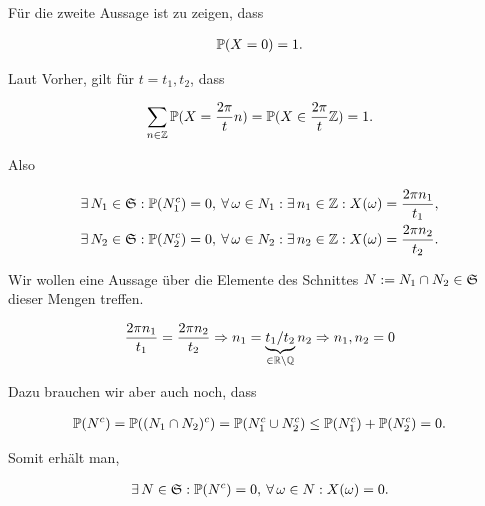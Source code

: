 \begin{solution}
Für die zweite Aussage ist zu zeigen, dass

\begin{align*}
  \P(X = 0) = 1.
\end{align*}

Laut Vorher, gilt für $t = t_1, t_2$, dass

\begin{align*}
  \sum_{n \in \Z} \P(X = \frac{2 \pi}{t} n)
  = \P(X \in \frac{2 \pi}{t} \Z)
  = 1.
\end{align*}

Also

\begin{align*}
  \Exists N_1 \in \S: \P(N_1^c) = 0, \:
  \Forall \omega \in N_1:
  \Exists n_1 \in \Z:
  X(\omega) = \frac{2 \pi n_1}{t_1}, \\
  \Exists N_2 \in \S: \P(N_2^c) = 0, \:
  \Forall \omega \in N_2:
  \Exists n_2 \in \Z:
  X(\omega) = \frac{2 \pi n_2}{t_2}.
\end{align*}

Wir wollen eine Aussage über die Elemente des Schnittes $N := N_1 \cap N_2 \in \S$ dieser Mengen treffen.

\begin{align*}
  \frac{2 \pi n_1}{t_1} = \frac{2 \pi n_2}{t_2}
  \Rightarrow
  n_1 = \underbrace{t_1/t_2}_{\in \R \setminus \Q} n_2
  \Rightarrow
  n_1, n_2 = 0
\end{align*}

Dazu brauchen wir aber auch noch, dass

\begin{align*}
  \P(N^c) =
  \P((N_1 \cap N_2)^c) =
  \P(N_1^c \cup N_2^c) \leq
  \P(N_1^c) + \P(N_2^c) = 0.
\end{align*}

Somit erhält man,

\begin{align*}
  \Exists N \in \S: \P(N^c) = 0, \:
  \Forall \omega \in N:
  X(\omega) = 0.
\end{align*}

\end{solution}
